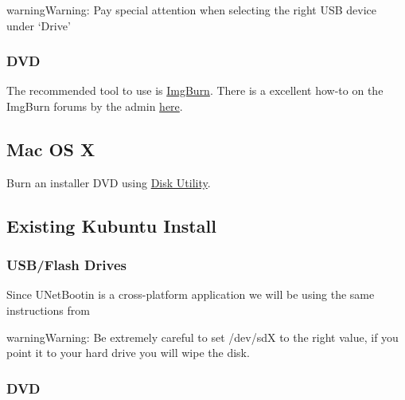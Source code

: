 \documentclass[letterpaper,10pt,english]{sphinxmanual}
\begin{document}
\begin{notice}{warning}{Warning:}
Pay special attention when selecting the right USB device under `Drive'
\end{notice}


\subsubsection{DVD}
\label{docs/installation:dvd}
The recommended tool to use is \href{http://www.imgburn.com/}{ImgBurn}. There is a excellent how-to on the ImgBurn forums by the admin \href{http://forum.imgburn.com/index.php?/topic/61-how-to-write-an-image-file-to-a-disc-using-imgburn/}{here}.


\subsection{Mac OS X}
\label{docs/installation:kubuntu-install-link}\label{docs/installation:mac-os-x}
Burn an installer DVD using \href{https://help.ubuntu.com/community/BurningIsoHowto\#Burning\_from\_Mac\_OS\_X}{Disk Utility}.


\subsection{Existing Kubuntu Install}
\label{docs/installation:existing-kubuntu-install}

\subsubsection{USB/Flash Drives}
\label{docs/installation:id1}
Since UNetBootin is a cross-platform application we will be using the same instructions from {\hyperref[docs/installation:usb\string-drives\string-link]{}}

\begin{notice}{warning}{Warning:}
Be extremely careful to set /dev/sdX to the right value, if you point it to your hard drive you will wipe the disk.
\end{notice}


\subsubsection{DVD}
\label{docs/installation:id2}
\end{document}
